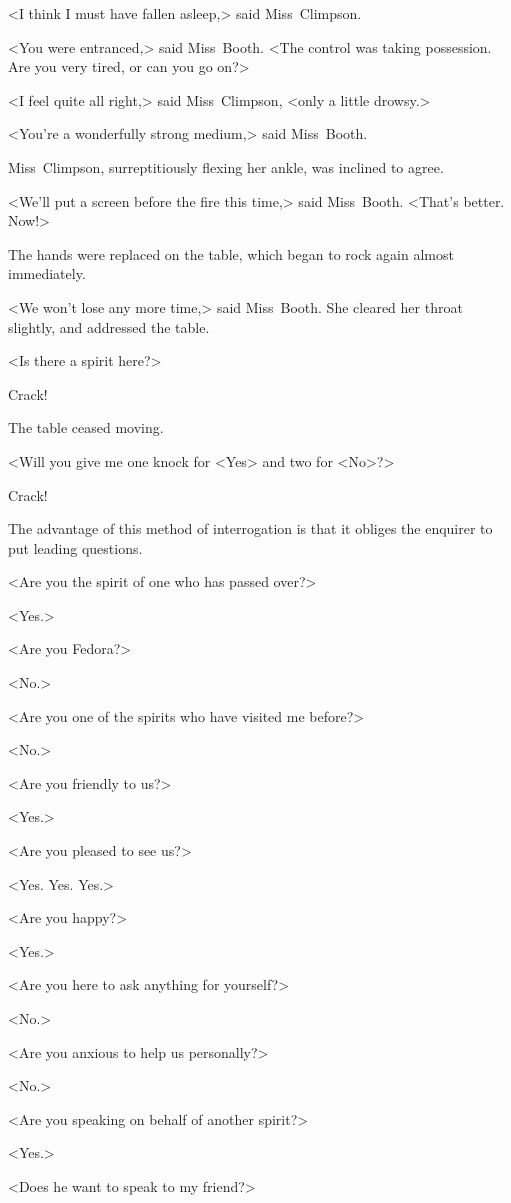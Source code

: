 <I think I must have fallen asleep,> said Miss~Climpson.

<You were entranced,> said Miss~Booth. <The control was taking possession. Are you very tired, or can you go on?>

<I feel quite all right,> said Miss~Climpson, <only a little drowsy.>

<You're a wonderfully strong medium,> said Miss~Booth.

Miss~Climpson, surreptitiously flexing her ankle, was inclined to agree.

<We'll put a screen before the fire this time,> said Miss~Booth. <That's better. Now!>

The hands were replaced on the table, which began to rock again almost immediately.

<We won't lose any more time,> said Miss~Booth. She cleared her throat slightly, and addressed the table.

<Is there a spirit here?>

Crack!

The table ceased moving.

<Will you give me one knock for <Yes> and two for <No>?>

Crack!

The advantage of this method of interrogation is that it obliges the enquirer to put leading questions.

<Are you the spirit of one who has passed over?>

<Yes.>

<Are you Fedora?>

<No.>

<Are you one of the spirits who have visited me before?>

<No.>

<Are you friendly to us?>

<Yes.>

<Are you pleased to see us?>

<Yes. Yes. Yes.>

<Are you happy?>

<Yes.>

<Are you here to ask anything for yourself?>

<No.>

<Are you anxious to help us personally?>

<No.>

<Are you speaking on behalf of another spirit?>

<Yes.>

<Does he want to speak to my friend?>

